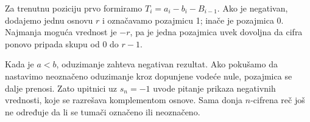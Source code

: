 Za trenutnu poziciju prvo formiramo $T_i=a_i-b_i-B_{i-1}$. Ako je negativan, dodajemo jednu osnovu $r$ i označavamo pozajmicu 1; inače je pozajmica 0. Najmanja moguća vrednost je $-r$, pa je jedna pozajmica uvek dovoljna da cifra ponovo pripada skupu od 0 do $r-1$.

Kada je $a<b$, oduzimanje zahteva negativan rezultat. Ako pokušamo da nastavimo neoznačeno oduzimanje kroz dopunjene vodeće nule, pozajmica se dalje prenosi. Zato upitnici uz $s_n=-1$ uvode pitanje prikaza negativnih vrednosti, koje se razrešava komplementom osnove. Sama donja $n$-cifrena reč još ne određuje da li se tumači označeno ili neoznačeno.
